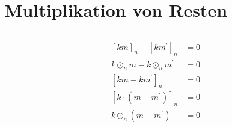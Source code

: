 \documentclass{../crypto}
\date{30. Oktober 2015}
\begin{document}
\maketitle

\section{Multiplikation von Resten}

\subsection{}






\begin{align*}
   \left[km\right]_n - \left[km^\prime\right]_n & = 0 \\
   k\odot_n m - k \odot_n m^\prime            & = 0 \\
   \left[km - km^\prime\right]_n              & = 0 \\
   \left[k\cdot(m - m^\prime)\right]_n        & = 0 \\
   k \odot_n (m - m^\prime)                   & = 0
\end{align*}
\end{document}
